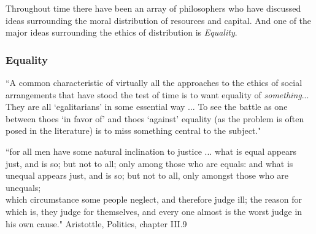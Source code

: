 
Throughout time there have been an array of philosophers who have discussed ideas surrounding the moral distribution of resources and capital. And one of the major ideas surrounding the ethics of distribution is \textit{Equality}.

\subsubsection{Equality}

\begin{displayquote}
``A common characteristic of virtually all the approaches to the ethics of social arrangements that have stood the test of time is to want equality of \textit{something}... They are all `egalitarians' in some essential way ... To see the battle as one between thoes `in favor of' and thoes `against' equality (as the problem is often posed in the literature) is to miss something central to the subject."\cite{18084} 
\end{displayquote}

\begin{displayquote}
``for all men have some natural inclination to justice ... what is equal appears just, and is so; but not to all; only among those who are equals: and what is unequal appears just, and is so; but not to all, only amongst those who are unequals;\\
which circumstance some people neglect, and therefore judge ill; the reason for which is, they judge for themselves, and every one almost is the worst judge in his own cause." Aristottle, Politics, chapter III.9\cite{AristotleGutenberg}
\end{displayquote}



